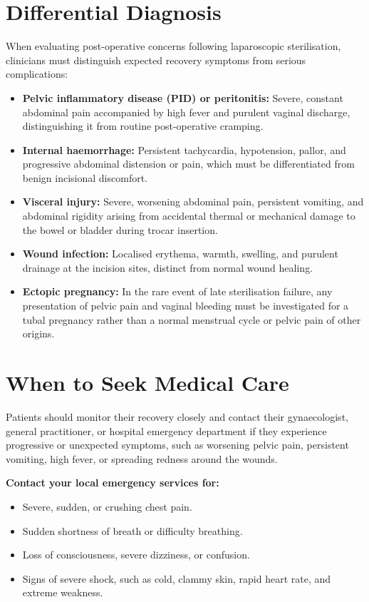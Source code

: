 \section*{Differential Diagnosis}
When evaluating post-operative concerns following laparoscopic sterilisation, clinicians must distinguish expected recovery symptoms from serious complications:
\begin{itemize}
    \item \textbf{Pelvic inflammatory disease (PID) or peritonitis:} Severe, constant abdominal pain accompanied by high fever and purulent vaginal discharge, distinguishing it from routine post-operative cramping.
    \item \textbf{Internal haemorrhage:} Persistent tachycardia, hypotension, pallor, and progressive abdominal distension or pain, which must be differentiated from benign incisional discomfort.
    \item \textbf{Visceral injury:} Severe, worsening abdominal pain, persistent vomiting, and abdominal rigidity arising from accidental thermal or mechanical damage to the bowel or bladder during trocar insertion.
    \item \textbf{Wound infection:} Localised erythema, warmth, swelling, and purulent drainage at the incision sites, distinct from normal wound healing.
    \item \textbf{Ectopic pregnancy:} In the rare event of late sterilisation failure, any presentation of pelvic pain and vaginal bleeding must be investigated for a tubal pregnancy rather than a normal menstrual cycle or pelvic pain of other origins.
\end{itemize}

\section*{When to Seek Medical Care}
Patients should monitor their recovery closely and contact their gynaecologist, general practitioner, or hospital emergency department if they experience progressive or unexpected symptoms, such as worsening pelvic pain, persistent vomiting, high fever, or spreading redness around the wounds.

\textbf{Contact your local emergency services for:}
\begin{itemize}
    \item Severe, sudden, or crushing chest pain.
    \item Sudden shortness of breath or difficulty breathing.
    \item Loss of consciousness, severe dizziness, or confusion.
    \item Signs of severe shock, such as cold, clammy skin, rapid heart rate, and extreme weakness.
\end{itemize}

